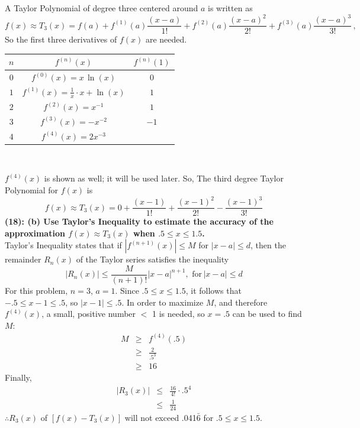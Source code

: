 \documentclass[12]{article}
\begin{document}
A Taylor Polynomial of degree three centered around $a$ is written as
$$\displaystyle{
f(x)\approx T_3(x) = f(a) + f^{(1)}(a)\frac{(x-a)}{1!} + f^{(2)}(a)\frac{(x-a)^2}{2!} + f^{(3)}(a)\frac{(x-a)^3}{3!}\,,
}$$
So the first three derivatives of $f(x)$ are needed.\\\begin{center}
\begin{tabular}{c|c|c}
$n$ & $f^{(n)}(x)$ & $f^{(n)}(1)$ \\ \hline
$0$ & $f^{(0)}(x) = x\,\ln{(x)}$ & $0$ \\ 
$1$ & $f^{(1)}(x) = \frac{1}{x}\cdot x + \ln{(x)}$ & $1$\\
$2$ & $f^{(2)}(x) = x^{-1}$ & $1$\\
$3$ & $f^{(3)}(x) = -x^{-2}$ & $-1$\\
$4$ & $f^{(4)}(x) = 2x^{-3}$
\end{tabular}\\
\end{center}
$f^{(4)}(x)$ is shown as well; it will be used later. So, The third degree Taylor Polynomial for $f(x)$ is 
$$\displaystyle{
f(x)\approx T_3(x) = 0 + \frac{(x-1)}{1!} + \frac{(x-1)^2}{2!} - \frac{(x-1)^3}{3!}
}$$
\textbf{ (18): (b) Use Taylor's Inequality to estimate the accuracy of the approximation $f(x)\approx T_3(x)$ when $.5\leq x\leq 1.5$.
}\\

Taylor's Inequality states that if $|f^{(n+1)}(x)|\leq M$ for $|x-a|\leq d$, then the remainder $R_n(x)$ of the Taylor series satisfies the inequality 
$$\displaystyle{
|R_n(x)|\leq \frac{M}{(n+1)!} {|x-a|}^{n+1},\,\,\mathrm{for}\, |x-a|\leq d
}$$
For this problem, $n=3$, $a=1$. Since $.5 \leq x \leq 1.5$, it follows that $-.5 \leq x-1 \leq .5$, so $|x-1|\leq .5$. In order to maximize $M$, and therefore $f^{(4)}(x)$, a small, positive number $<$ 1 is needed, so $x=.5$ can be used to find $M$:
\begin{eqnarray}
M &\geq & f^{(4)}(.5)\\
&\geq & \frac{2}{.5^3}\\
&\geq & 16
\end{eqnarray} 
Finally,
\begin{eqnarray}
|R_3(x)| &\leq & \frac{16}{4!}\cdot {.5}^4\\
&\leq & \frac{1}{24}
\end{eqnarray}
$\therefore R_3(x)$ of $[f(x)-T_3(x)]$ will not exceed .041$\bar{6}$ for $.5 \leq x \leq 1.5$.\\
\end{document}
